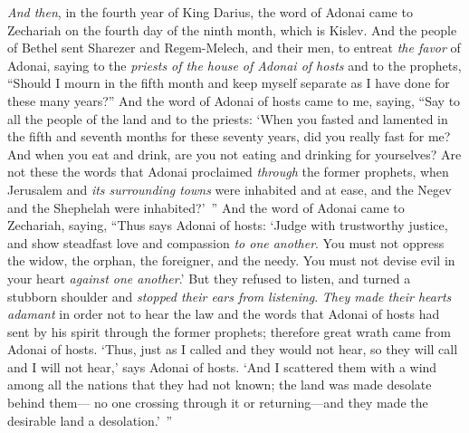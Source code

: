 \begin{biblechapter} %
\verse \textit{And then}, in the fourth year of King Darius, the word of Adonai came to Zechariah on the fourth day of the ninth month, which is Kislev.
\verse And the people of Bethel sent Sharezer and Regem-Melech, and their men, to entreat \textit{the favor} of Adonai,
\verse saying to the \textit{priests of the house of Adonai of hosts} and to the prophets, “Should I mourn in the fifth month and keep myself separate as I have done for these many years?”
\verse And the word of Adonai of hosts came to me, saying,
\verse “Say to all the people of the land and to the priests: ‘When you fasted and lamented in the fifth and seventh months for these seventy years, did you really fast for me?
\verse And when you eat and drink, are you not eating and drinking for yourselves?
\verse Are not these the words that Adonai proclaimed \textit{through} the former prophets, when Jerusalem and \textit{its surrounding towns} were inhabited and at ease, and the Negev and the Shephelah were inhabited?’ ”
\verse And the word of Adonai came to Zechariah, saying,
\verse “Thus says Adonai of hosts: ‘Judge with trustworthy justice, and show steadfast love and compassion \textit{to one another}.
\verse You must not oppress the widow, the orphan, the foreigner, and the needy. You must not devise evil in your heart \textit{against one another}.’
\verse But they refused to listen, and turned a stubborn shoulder and \textit{stopped their ears from listening}.
\verse \textit{They made their hearts adamant} in order not to hear the law and the words that Adonai of hosts had sent by his spirit through the former prophets; therefore great wrath came from Adonai of hosts.
\verse ‘Thus, just as I called and they would not hear, so they will call and I will not hear,’ says Adonai of hosts.
\verse ‘And I scattered them with a wind among all the nations that they had not known; the land was made desolate behind them— no one crossing through it or returning—and they made the desirable land a desolation.’ ”
\end{biblechapter}

